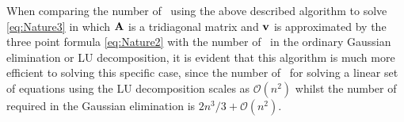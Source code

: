When comparing the number of \flops \, using the above described algorithm to solve \eqref{eq:Nature3} in which $\mbox{\textbf{A}}$ is a tridiagonal matrix and $\mbox{\textbf{v}}$ is approximated by the three point formula \eqref{eq:Nature2} with the number of \flops \, in the ordinary Gaussian elimination or LU decomposition, it is evident that this algorithm is much more efficient to solving this specific case, since the number of \flops \, for solving a linear set of equations using the LU decomposition scales as $\mathcal{O}(n^2)$ whilst the number of \flops \, required in the Gaussian elimination is $2n^3 /3 +\mathcal{O}(n^2)$. \cite[173]{CompLectureNotes}



